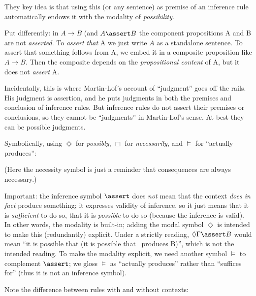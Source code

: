 \documentclass{article}
\begin{document}
They key idea is that using this (or any sentence) as premise of an
inference rule automatically endows it with the modality of
\textit{possibility}.

Put differently: in \(A\rightarrow B\) (and \(A\linfer B\) the
component propositions A and B are not \textit{asserted}. To
\textit{assert that} A we just write \(A\) as a standalone sentence.
To assert that something follows from A, we embed it in a composite
proposition like \(A\rightarrow B\). Then the composite depends on the
\textit{propositional content} of A, but it does not \textit{assert}
A.

Incidentally, this is where Martin-Lof's account of ``judgment'' goes
off the rails. His judgment is assertion, and he puts judgments in
both the premises and conclusion of inference rules. But inference
rules do not assert their premises or conclusions, so they cannot be
``judgments'' in Martin-Lof's sense. At best they can be possible
judgments.

Symbolically, using \( \Diamond \) for \textit{possibly}, \(\Box\)
for \textit{necessarily}, and \(\models\) for ``actually produces'':


(Here the necessity symbol is just a reminder that consequences are
always necessary.)

Important: the inference symbol \(\linfer\) does \textit{not} mean that
the context \textit{does in fact} produce something; it expresses
validity of inference, so it just means that it is \textit{sufficient}
to do so, that it is \textit{possible} to do so (because the inference
is valid). In other words, the modality is built-in; adding the modal
symbol \(\Diamond\) is intended to make this (redundantly) explicit.
Under a strictly reading, \(\Diamond\Gamma\linfer B\) would mean ``it
is possible that (it is possible that \Gamma\ produces B)'', which is
not the intended reading. To make the modality explicit, we need
another symbol \(\models\) to complement \(\linfer\); we gloss
\(\models\) as ``actually produces'' rather than ``suffices for''
(thus it is not an inference symbol).

Note the difference between rules with and without contexts:
\end{document}
